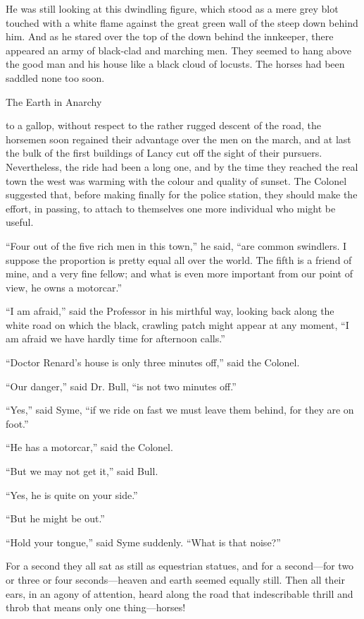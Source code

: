 He was still looking at this dwindling figure, which stood as a mere grey blot touched with a white flame against the great green wall of the steep down behind him. And as he stared over the top of the down behind the innkeeper, there appeared an army of black-clad and marching men. They seemed to hang above the good man and his house like a black cloud of locusts. The horses had been saddled none too soon.

\chap[earthin] The Earth in Anarchy

 to a gallop, without respect to the rather rugged descent of the road, the horsemen soon regained their advantage over the men on the march, and at last the bulk of the first buildings of Lancy cut off the sight of their pursuers. Nevertheless, the ride had been a long one, and by the time they reached the real town the west was warming with the colour and quality of sunset. The Colonel suggested that, before making finally for the police station, they should make the effort, in passing, to attach to themselves one more individual who might be useful.

“Four out of the five rich men in this town,” he said, “are common swindlers. I suppose the proportion is pretty equal all over the world. The fifth is a friend of mine, and a very fine fellow; and what is even more important from our point of view, he owns a motorcar.”

“I am afraid,” said the Professor in his mirthful way, looking back along the white road on which the black, crawling patch might appear at any moment, “I am afraid we have hardly time for afternoon calls.”

“Doctor Renard’s house is only three minutes off,” said the Colonel.

“Our danger,” said Dr. Bull, “is not two minutes off.”

“Yes,” said Syme, “if we ride on fast we must leave them behind, for they are on foot.”

“He has a motorcar,” said the Colonel.

“But we may not get it,” said Bull.

“Yes, he is quite on your side.”

“But he might be out.”

“Hold your tongue,” said Syme suddenly. “What is that noise?”

For a second they all sat as still as equestrian statues, and for a second⁠—for two or three or four seconds⁠—heaven and earth seemed equally still. Then all their ears, in an agony of attention, heard along the road that indescribable thrill and throb that means only one thing⁠—horses!

